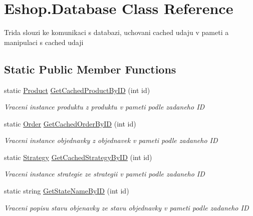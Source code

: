\hypertarget{class_eshop_1_1_database}{}\section{Eshop.\+Database Class Reference}
\label{class_eshop_1_1_database}


Trida slouzi ke komunikaci s databazi, uchovani cached udaju v pameti a manipulaci s cached udaji  


\subsection*{Static Public Member Functions}
\begin{DoxyCompactItemize}
\item 
static \mbox{\hyperlink{class_eshop_1_1_product}{Product}} \mbox{\hyperlink{class_eshop_1_1_database_a77cb0c6d892ec285991db9b705ea8ed6}{Get\+Cached\+Product\+By\+ID}} (int id)
\begin{DoxyCompactList}\small\item\em Vraceni instance produktu z produktu v pameti podle zadaneho ID \end{DoxyCompactList}\item 
static \mbox{\hyperlink{class_eshop_1_1_order}{Order}} \mbox{\hyperlink{class_eshop_1_1_database_a7a2971f27ae7da358f1fceca1bd712ec}{Get\+Cached\+Order\+By\+ID}} (int id)
\begin{DoxyCompactList}\small\item\em Vraceni instance objednavky z objednavek v pameti podle zadaneho ID \end{DoxyCompactList}\item 
static \mbox{\hyperlink{class_eshop_1_1_database_entites_1_1_strategy}{Strategy}} \mbox{\hyperlink{class_eshop_1_1_database_a3dcc471a096b7d40671266fa0853648d}{Get\+Cached\+Strategy\+By\+ID}} (int id)
\begin{DoxyCompactList}\small\item\em Vraceni instance strategie ze strategii v pameti podle zadaneho ID \end{DoxyCompactList}\item 
static string \mbox{\hyperlink{class_eshop_1_1_database_a6339b833e02a6898bd488e1562b6475e}{Get\+State\+Name\+By\+ID}} (int id)
\begin{DoxyCompactList}\small\item\em Vraceni popisu stavu objenavky ze stavu objednavky v pameti podle zadaneho ID \end{DoxyCompactList}\item 

\end{DoxyCompactItemize}

